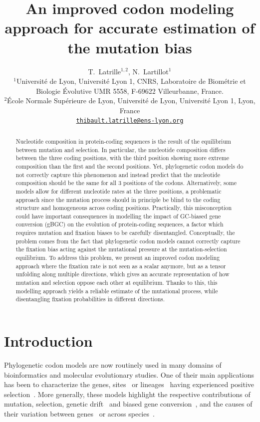 \documentclass{article}
\title{An improved codon modeling approach for accurate estimation of the mutation bias}
\author{
 \large
 T.~{Latrille}$^{1,2}$, N.~{Lartillot}$^{1}$ \\
 \normalsize
	$^{1}$Université de Lyon, Université Lyon 1, CNRS, Laboratoire de Biométrie et Biologie Évolutive UMR 5558, F-69622 Villeurbanne, France.\\
	$^{2}$École Normale Supérieure de Lyon, Université de Lyon, Université Lyon 1, Lyon, France\\
	\texttt{\href{mailto:thibault.latrille@ens-lyon.org}{thibault.latrille@ens-lyon.org}} \\
}
\begin{document}
\maketitle

\begin{abstract}
 Nucleotide composition in protein-coding sequences is the result of the equilibrium between mutation and selection.
 In particular, the nucleotide composition differs between the three coding positions, with the third position showing more extreme composition than the first and the second positions.
 Yet, phylogenetic codon models do not correctly capture this phenomenon and instead predict that the nucleotide composition should be the same for all 3 positions of the codons.
 Alternatively, some models allow for different nucleotide rates at the three positions, a problematic approach since the mutation process should in principle be blind to the coding structure and homogeneous across coding positions.
 Practically, this misconception could have important consequences in modelling the impact of GC-biased gene conversion (gBGC) on the evolution of protein-coding sequences, a factor which requires mutation and fixation biases to be carefully disentangled.
 Conceptually, the problem comes from the fact that phylogenetic codon models cannot correctly capture the fixation bias acting against the mutational pressure at the mutation-selection equilibrium.
 To address this problem, we present an improved codon modeling approach where the fixation rate is not seen as a scalar anymore, but as a tensor unfolding along multiple directions, which gives an accurate representation of how mutation and selection oppose each other at equilibrium.
 Thanks to this, this modelling approach yields a reliable estimate of the mutational process, while disentangling fixation probabilities in different directions.
\end{abstract}


\section{Introduction}

Phylogenetic codon models are now routinely used in many domains of bioinformatics and molecular evolutionary studies.
One of their main applications has been to characterize the genes, sites~\citep{Nielsen1998, Yang2005, Murrell2012} or lineages~\citep{Zhang2004, Pond2011} having experienced positive selection~\citep{Murrell2015, Enard2016}.
More generally, these models highlight the respective contributions of mutation, selection, genetic drift~\citep{Teufel2018} and biased gene conversion~\citep{Pouyet2019, Kosiol2019}, and the causes of their variation between genes~\citep{Zhang2015} or across species~\citep{Seo2004, Popadin2007, Lartillot2011}.
\end{document}

